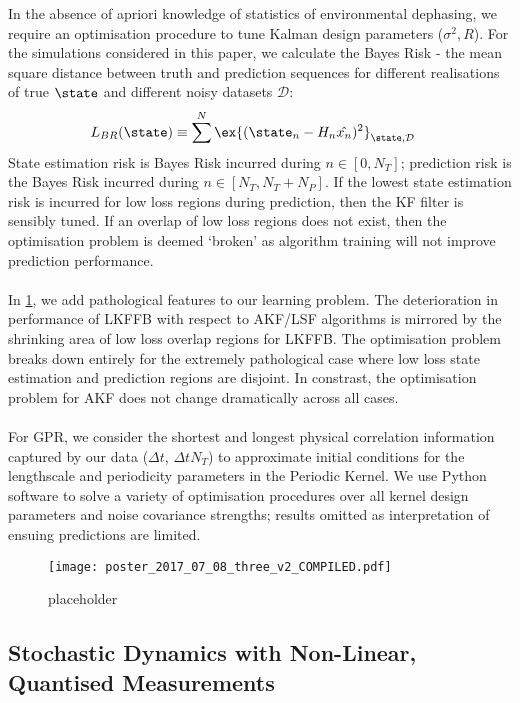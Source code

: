 In the absence of apriori knowledge of statistics of environmental dephasing, we require an optimisation procedure to tune Kalman design parameters ($\sigma^2, R$). For the simulations considered in this paper, we calculate the Bayes Risk - the mean square distance between truth and prediction sequences for different realisations of true $\state$ and different noisy datasets $\mathcal{D}$:
\begin{align}
L_{BR}(\state) & \equiv \sum^{N}\ex{(\state_n - H_n\hat{x_n})^2}_{\state,\mathcal{D}} \label{eqn:sec:ap_opt_LossBR}
\end{align}
State estimation risk is Bayes Risk incurred during $n \in [0, N_T]$; prediction risk is the Bayes Risk incurred during $n \in [N_T, N_T + N_P]$. If the lowest state estimation risk is incurred for low loss regions during prediction, then the KF filter is sensibly tuned. If an overlap of low loss regions does not exist, then the optimisation problem is deemed `broken' as algorithm training will not improve prediction performance. 
\\
\\
In \cref{fig:optimisation}, we add pathological features to our learning problem. The deterioration in performance of LKFFB with respect to AKF/LSF algorithms is mirrored by the shrinking area of low loss overlap regions for LKFFB. The optimisation problem breaks down entirely for the extremely pathological case where low loss state estimation and prediction regions are disjoint. In constrast, the optimisation problem for AKF does not change dramatically across all cases. 
\\
\\
For GPR, we consider the shortest and longest physical correlation information captured by our data ($\Delta t$, $\Delta t N_T$) to approximate initial conditions for the lengthscale and periodicity parameters in the Periodic Kernel. We use \cite{gpy2014} Python software to solve a variety of optimisation procedures over all kernel design parameters and noise covariance strengths; results omitted as interpretation of ensuing predictions are limited.  
\begin{widetext}
\begin{figure}[h] 
	\caption{placeholder}
	\texttt{[image: poster\_2017\_07\_08\_three\_v2\_COMPILED.pdf]} 
	\label{fig:optimisation}
\end{figure}
\end{widetext}
\FloatBarrier

\subsection{Stochastic Dynamics with Non-Linear, Quantised Measurements} \label{sec:main:part5}


